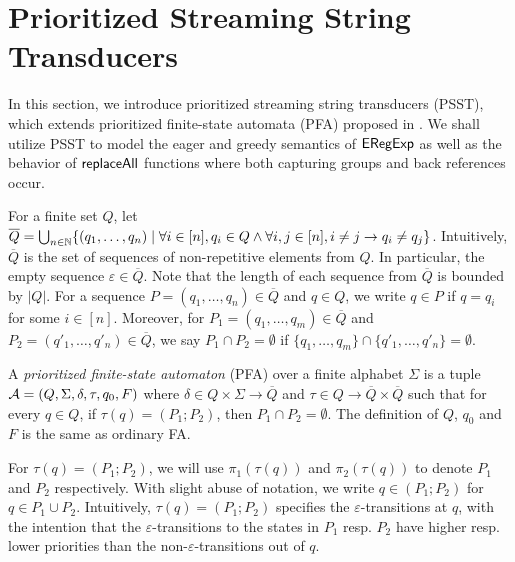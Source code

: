 
\section{Prioritized Streaming String Transducers}  \label{sect:psst}

In this section, we introduce prioritized streaming string transducers (PSST), which extends prioritized finite-state automata (PFA) proposed in \cite{BM17}. We shall utilize PSST to model  the eager and greedy semantics of ${\sf ERegExp}$ as well as the behavior of $\mathsf{replaceAll}$ functions where both capturing groups and back references occur.

%
For a finite set $Q$, let $\overline{Q} = \bigcup_{n\in \mathbb{N}}\{ (q_1, \ldots, q_n) \mid \forall i \in [n], q_i \in Q \wedge \forall i,j \in[n], i \neq j \rightarrow q_i \neq q_j \}$. Intuitively, $\overline{Q}$ is the set of sequences of non-repetitive elements from $Q$. In particular, the empty sequence $\varepsilon \in \overline{Q}$. Note that the length of each sequence from $\overline{Q}$ is bounded by  $| Q |$. For a sequence $P = (q_1, \ldots, q_n) \in \overline{Q}$ and  $q \in Q$, we write $q \in P$ if  $q = q_i$ for some $i \in [n]$. Moreover, for $P_1 = (q_1, \ldots, q_m) \in \overline{Q}$ and $P_2 = (q'_1, \ldots, q'_n) \in \overline{Q}$, we say $P_1 \cap P_2 = \emptyset$ if $\{q_1, \ldots, q_m\} \cap \{q'_1, \ldots, q'_n\} = \emptyset$.


\begin{definition}\label{def-pfa}
  A \emph{prioritized finite-state automaton} (PFA) over a finite alphabet $\Sigma$ is a tuple $\mathcal{A}=(Q, \Sigma, \delta, \tau, q_0, F)$ where $\delta \in Q
  \times \Sigma \rightarrow \overline{Q}$ and $\tau \in Q \rightarrow \overline{Q} \times \overline{Q}$ such that for every $q \in Q$, if $\tau(q) = (P_1; P_2)$, then $P_1 \cap P_2 = \emptyset$. 
  The definition of $Q$, $q_0$ and $F$ is the same as ordinary FA.
\end{definition}
For $\tau(q) = (P_1; P_2)$, we will use $\pi_1(\tau(q))$ and $\pi_2(\tau(q))$ to denote $P_1$ and $P_2$ respectively.  With slight abuse of notation, we write $q\in (P_1; P_2)$ for $q\in P_1\cup P_2$. Intuitively, $\tau(q)=(P_1; P_2)$ specifies the $\varepsilon$-transitions at $q$, with the intention that the $\varepsilon$-transitions to the states in $P_1$ resp. $P_2$ have higher resp. lower priorities than the non-$\varepsilon$-transitions out of $q$.
  
